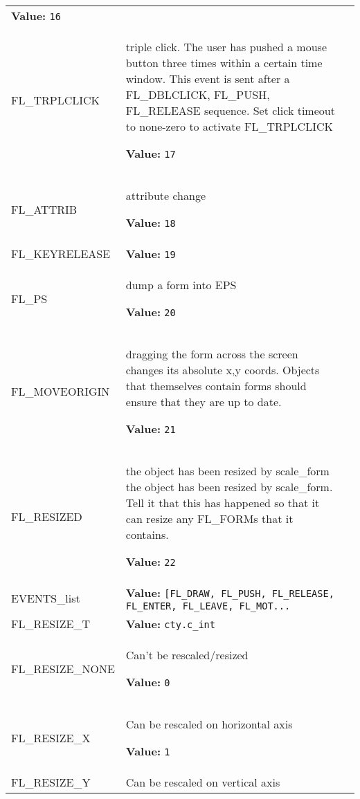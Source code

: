\begin{longtable}{|p{\varnamewidth}|p{\vardescrwidth}|l}
\textbf{Value:} 
{\tt 16}&\\
\cline{1-2}
\raggedright F\-L\-\_\-T\-R\-P\-L\-C\-L\-I\-C\-K\- & \raggedright triple click. The user has pushed a mouse button three times within a
certain time window. This event is sent after a FL\_DBLCLICK, FL\_PUSH,
FL\_RELEASE sequence. Set click timeout to none-zero to activate FL\_TRPLCLICK

\textbf{Value:} 
{\tt 17}&\\
\cline{1-2}
\raggedright F\-L\-\_\-A\-T\-T\-R\-I\-B\- & \raggedright attribute change

\textbf{Value:} 
{\tt 18}&\\
\cline{1-2}
\raggedright F\-L\-\_\-K\-E\-Y\-R\-E\-L\-E\-A\-S\-E\- & \raggedright \textbf{Value:} 
{\tt 19}&\\
\cline{1-2}
\raggedright F\-L\-\_\-P\-S\- & \raggedright dump a form into EPS

\textbf{Value:} 
{\tt 20}&\\
\cline{1-2}
\raggedright F\-L\-\_\-M\-O\-V\-E\-O\-R\-I\-G\-I\-N\- & \raggedright dragging the form across the screen changes its absolute x,y coords.
Objects that themselves contain forms should ensure that they are up to
date.

\textbf{Value:} 
{\tt 21}&\\
\cline{1-2}
\raggedright F\-L\-\_\-R\-E\-S\-I\-Z\-E\-D\- & \raggedright the object has been resized by scale\_form the object has been resized by
scale\_form. Tell it that this has happened so that it can resize any FL\_FORMs
that it contains.

\textbf{Value:} 
{\tt 22}&\\
\cline{1-2}
\raggedright E\-V\-E\-N\-T\-S\-\_\-l\-i\-s\-t\- & \raggedright \textbf{Value:} 
{\tt [FL\_DRAW, FL\_PUSH, FL\_RELEASE, FL\_ENTER, FL\_LEAVE, FL\_MOT\texttt{...}}&\\
\cline{1-2}
\raggedright F\-L\-\_\-R\-E\-S\-I\-Z\-E\-\_\-T\- & \raggedright \textbf{Value:} 
{\tt cty.c\_int}&\\
\cline{1-2}
\raggedright F\-L\-\_\-R\-E\-S\-I\-Z\-E\-\_\-N\-O\-N\-E\- & \raggedright Can't be rescaled/resized

\textbf{Value:} 
{\tt 0}&\\
\cline{1-2}
\raggedright F\-L\-\_\-R\-E\-S\-I\-Z\-E\-\_\-X\- & \raggedright Can be rescaled on horizontal axis

\textbf{Value:} 
{\tt 1}&\\
\cline{1-2}
\raggedright F\-L\-\_\-R\-E\-S\-I\-Z\-E\-\_\-Y\- & \raggedright Can be rescaled on vertical axis


\end{longtable}
